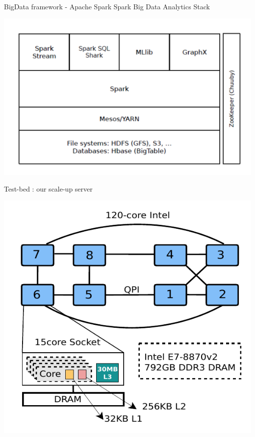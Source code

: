 \documentclass[english]{beamer} %
\begin{document}
\begin{frame}{BigData framework - Apache Spark}
Spark Big Data Analytics Stack
\begin{center}
\includegraphics[scale=0.5]{fig/bigdatastack}
\end{center}
\end{frame}

\begin{frame}{Test-bed : our scale-up server}
\begin{center}
\includegraphics[scale=0.8]{fig/xeon}
\end{center}
\end{frame}
\end{document}
